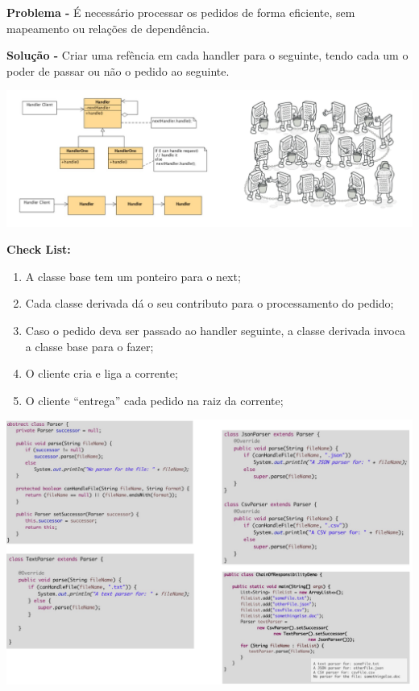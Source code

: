 \documentclass{article}
\begin{document}
\begin{flushleft}
    \textbf{Problema -} É necessário processar os pedidos de forma eficiente, sem mapeamento ou relações
de dependência.
\end{flushleft}

\begin{flushleft}
    \textbf{Solução -} Criar uma refência em cada handler para o seguinte, tendo cada um o poder de
passar ou não o pedido ao seguinte.
\end{flushleft}

\begin{center}
    \includegraphics[scale=0.3]{Images/58.png}
\end{center}

\begin{flushleft}
    \textbf{Check List:}

    \begin{enumerate}
        \item A classe base tem um ponteiro para o next;
        \item Cada classe derivada dá o seu contributo para o processamento do pedido;
        \item Caso o pedido deva ser passado ao handler seguinte, a classe derivada invoca
        a classe base para o fazer;
        \item O cliente cria e liga a corrente;
        \item O cliente “entrega” cada pedido na raiz da corrente;
    \end{enumerate}
\end{flushleft}

\begin{center}
    \includegraphics[scale=0.35]{Images/59.png}
\end{center}
\end{document}
